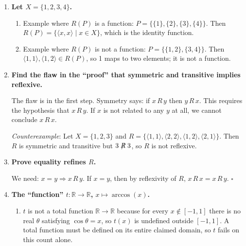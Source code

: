 \documentclass[11pt]{book}
\def\RN{\mathbb{R}}
\begin{document}
\begin{enumerate}[{0.}1. ]
\textit{Symmetry}: If $x$ and $y$ are in the same block, so are $y$ and $x$.

\textit{Transitivity}: If $x,y$ are in block $A_i$ and $y,z$ are in block $A_j$, then since $y \in A_i \cap A_j$ and blocks are disjoint, $A_i = A_j$. So $x$ and $z$ are in the same block.

\item \textbf{Let $X = \{1,2,3,4\}$.}

\begin{enumerate}
\item Example where $R(P)$ is a function: $P = \{\{1\},\{2\},\{3\},\{4\}\}$. Then $R(P) = \{\langle x,x\rangle \mid x \in X\}$, which is the identity function.

\item Example where $R(P)$ is not a function: $P = \{\{1,2\},\{3,4\}\}$. Then $\langle 1,1\rangle,\langle 1,2\rangle \in R(P)$, so 1 maps to two elements; it is not a function.
\end{enumerate}

\item \textbf{Find the flaw in the ``proof'' that symmetric and transitive implies reflexive.}

The flaw is in the first step. Symmetry says: if $x\,R\,y$ then $y\,R\,x$. This requires the hypothesis that $x\,R\,y$. If $x$ is not related to any $y$ at all, we cannot conclude $x\,R\,x$.

\textit{Counterexample}: Let $X = \{1,2,3\}$ and $R = \{\langle 1,1\rangle, \langle 2,2\rangle, \langle 1,2\rangle, \langle 2,1\rangle\}$. Then $R$ is symmetric and transitive but $3 \not\mathrel{R} 3$, so $R$ is not reflexive.

\item \textbf{Prove equality refines $R$.}

We need: $x = y \Rightarrow x\,R\,y$. If $x = y$, then by reflexivity of $R$, $x\,R\,x = x\,R\,y$. $\square$

\item \textbf{The ``function'' $t: \RN \to \RN$, $x \mapsto \arccos(x)$.}

\begin{enumerate}
\item $t$ is not a total function $\mathbb{R}\to\mathbb{R}$ because for every $x \notin [-1,1]$ there is no real $\theta$ satisfying $\cos\theta = x$, so $t(x)$ is undefined outside $[-1,1]$.
A total function must be defined on its entire claimed domain, so $t$ fails on this count alone.


\end{enumerate}
\end{enumerate}
\end{document}
